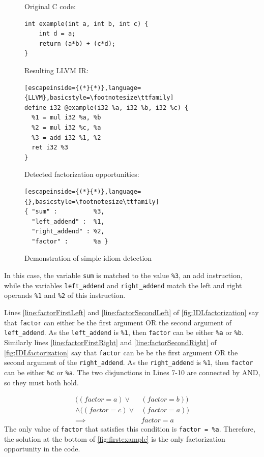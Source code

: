 \begin{figure}[ht]
Original C code:
\begin{lstlisting}[basicstyle=\footnotesize\ttfamily]
int example(int a, int b, int c) {
    int d = a;
    return (a*b) + (c*d);
}
\end{lstlisting}
\vspace{1em}
Resulting LLVM IR:
\begin{lstlisting}[escapeinside={(*}{*)},language={LLVM},basicstyle=\footnotesize\ttfamily]
define i32 @example(i32 %a, i32 %b, i32 %c) {
  %1 = mul i32 %a, %b
  %2 = mul i32 %c, %a
  %3 = add i32 %1, %2
  ret i32 %3
}
\end{lstlisting}
\vspace{1em}
Detected factorization opportunities:
\begin{lstlisting}[escapeinside={(*}{*)},language={},basicstyle=\footnotesize\ttfamily]
{ "sum" :          %3,
  "left_addend" :  %1,
  "right_addend" : %2,
  "factor" :       %a }
\end{lstlisting}
\vspace{-0.3cm}
\caption{Demonstration of simple idiom detection}
\label{fig:firstexample}
\end{figure}

    In this case, the variable {\tt sum} is matched to the value {\tt \%3}, an
    add instruction, while the variables {\tt left\_addend} and
    {\tt right\_addend} match the left and right operands {\tt \%1} and
    {\tt \%2} of this instruction. 

    Lines \ref{line:factorFirstLeft} and \ref{line:factorSecondLeft} of
    \autoref{fig:IDLfactorization} say that {\tt factor} can either be the first
    argument OR the second argument of {\tt left\_addend}.
    As the {\tt left\_addend} is {\tt \%1}, then {\tt factor} can be either
    {\tt \%a} or {\tt \%b}.
    Similarly lines \ref{line:factorFirstRight} and
    \ref{line:factorSecondRight} of \autoref{fig:IDLfactorization} say that
    {\tt factor} can be be the first argument OR the second argument of the
    {\tt right\_addend}.
    As the {\tt right\_addend} is {\tt \%1}, then {\tt factor} can be either
    {\tt \%c} or {\tt \%a}.
    The two disjunctions in Lines 7-10 are connected by AND, so they must both
    hold.

\begin{equation}
\begin{split}
((factor = a) \lor & (factor = b)) \\\land ((factor = c) \lor & (factor = a)) \\
\implies & factor = a 
\end{split}
\nonumber
\end{equation}
The only value of {\tt factor} that satisfies this condition is {\tt factor = \%a}.
Therefore, the solution at the bottom of \autoref{fig:firstexample} is the only factorization opportunity in the code.

